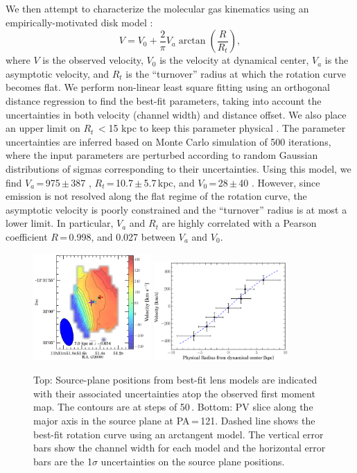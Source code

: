 \documentclass[]{emulateapj}
\begin{document}
We then attempt to characterize the molecular gas kinematics using an
empirically-motivated disk model \citep[\eg][]{Courteau97a,Puech08a,Miller11a}:
\begin{equation}
V = V_0 + \frac{2}{\pi} V_{a} \arctan(\frac{R}{R_{t}}),
\end{equation}
where $V$ is the observed velocity, $V_0$ is the velocity at dynamical center,
$V_{a}$ is the asymptotic velocity, and $R_{t}$ is the ``turnover''
radius at which the rotation curve becomes flat.
We perform non-linear least square fitting using an orthogonal distance
regression to find the best-fit parameters,
taking into account the uncertainties in both velocity (channel width) and
distance offset. We also place an upper limit on $R_{t}$\,$<$15 kpc
to keep this parameter physical \citep[\eg][]{Puech08a,Miller11a}.
The parameter uncertainties are inferred based on Monte Carlo simulation
of 500 iterations, where the input parameters are perturbed
according to random Gaussian distributions of sigmas
corresponding to their uncertainties.
Using this model, we find $V_{a}$\,=\,975\,$\pm$\,387 \kms,
$R_{t}$\,=\,10.7\,$\pm$\,5.7\,kpc, and $V_0$\,=\,28\,$\pm$\,40 \kms.
However, since emission is not resolved along the flat regime
of the rotation curve, the asymptotic velocity is poorly constrained and
the ``turnover'' radius is at most a lower limit.
In particular, $V_{a}$ and $R_{t}$ are highly correlated with a
Pearson coefficient $R$\,=\,0.998, and 0.027 between $V_{a}$ and $V_0$.

\begin{figure}[!htbp]
\centering
\includegraphics[width=0.4\textwidth]{../Figures/veloGradient_markers}
\includegraphics[width=0.455\textwidth]{../Figures/bestfit_PV.eps}
\caption{Top: Source-plane positions from best-fit \bco lens models are indicated with their associated uncertainties atop
the observed first moment map. The contours are at steps of 50\,\kms.
Bottom: PV slice along the major axis in the source plane at PA\,=\,121\degr.
Dashed line shows the best-fit rotation curve using an arctangent model.
The vertical error bars show the channel width for
each model and the horizontal error bars are the
1$\sigma$ uncertainties on the source plane positions.
 \label{fig:PV}}
\end{figure}
\end{document}
